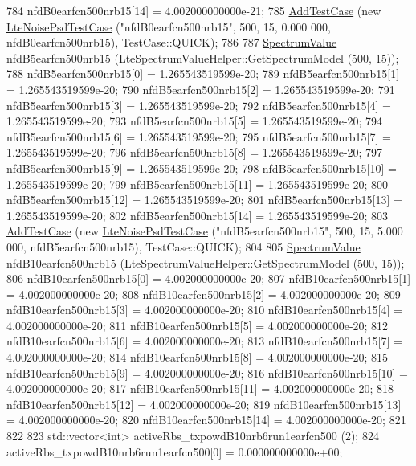 \begin{DoxyCode}
784   nfdB0earfcn500nrb15[14] = 4.002000000000e-21;
785   \hyperlink{classns3_1_1TestCase_a3718088e3eefd5d6454569d2e0ddd835}{AddTestCase} (\textcolor{keyword}{new} \hyperlink{classLteNoisePsdTestCase}{LteNoisePsdTestCase} (\textcolor{stringliteral}{"nfdB0earfcn500nrb15"}, 500, 15, 0.000
      000, nfdB0earfcn500nrb15), TestCase::QUICK);
786 
787   \hyperlink{classns3_1_1SpectrumValue}{SpectrumValue} nfdB5earfcn500nrb15 (LteSpectrumValueHelper::GetSpectrumModel (500, 15));
788   nfdB5earfcn500nrb15[0] = 1.265543519599e-20;
789   nfdB5earfcn500nrb15[1] = 1.265543519599e-20;
790   nfdB5earfcn500nrb15[2] = 1.265543519599e-20;
791   nfdB5earfcn500nrb15[3] = 1.265543519599e-20;
792   nfdB5earfcn500nrb15[4] = 1.265543519599e-20;
793   nfdB5earfcn500nrb15[5] = 1.265543519599e-20;
794   nfdB5earfcn500nrb15[6] = 1.265543519599e-20;
795   nfdB5earfcn500nrb15[7] = 1.265543519599e-20;
796   nfdB5earfcn500nrb15[8] = 1.265543519599e-20;
797   nfdB5earfcn500nrb15[9] = 1.265543519599e-20;
798   nfdB5earfcn500nrb15[10] = 1.265543519599e-20;
799   nfdB5earfcn500nrb15[11] = 1.265543519599e-20;
800   nfdB5earfcn500nrb15[12] = 1.265543519599e-20;
801   nfdB5earfcn500nrb15[13] = 1.265543519599e-20;
802   nfdB5earfcn500nrb15[14] = 1.265543519599e-20;
803   \hyperlink{classns3_1_1TestCase_a3718088e3eefd5d6454569d2e0ddd835}{AddTestCase} (\textcolor{keyword}{new} \hyperlink{classLteNoisePsdTestCase}{LteNoisePsdTestCase} (\textcolor{stringliteral}{"nfdB5earfcn500nrb15"}, 500, 15, 5.000
      000, nfdB5earfcn500nrb15), TestCase::QUICK);
804 
805   \hyperlink{classns3_1_1SpectrumValue}{SpectrumValue} nfdB10earfcn500nrb15 (LteSpectrumValueHelper::GetSpectrumModel (500, 15));
806   nfdB10earfcn500nrb15[0] = 4.002000000000e-20;
807   nfdB10earfcn500nrb15[1] = 4.002000000000e-20;
808   nfdB10earfcn500nrb15[2] = 4.002000000000e-20;
809   nfdB10earfcn500nrb15[3] = 4.002000000000e-20;
810   nfdB10earfcn500nrb15[4] = 4.002000000000e-20;
811   nfdB10earfcn500nrb15[5] = 4.002000000000e-20;
812   nfdB10earfcn500nrb15[6] = 4.002000000000e-20;
813   nfdB10earfcn500nrb15[7] = 4.002000000000e-20;
814   nfdB10earfcn500nrb15[8] = 4.002000000000e-20;
815   nfdB10earfcn500nrb15[9] = 4.002000000000e-20;
816   nfdB10earfcn500nrb15[10] = 4.002000000000e-20;
817   nfdB10earfcn500nrb15[11] = 4.002000000000e-20;
818   nfdB10earfcn500nrb15[12] = 4.002000000000e-20;
819   nfdB10earfcn500nrb15[13] = 4.002000000000e-20;
820   nfdB10earfcn500nrb15[14] = 4.002000000000e-20;
821 
822 
823   std::vector<int> activeRbs\_txpowdB10nrb6run1earfcn500 (2);
824   activeRbs\_txpowdB10nrb6run1earfcn500[0] = 0.000000000000e+00;

\end{DoxyCode}
